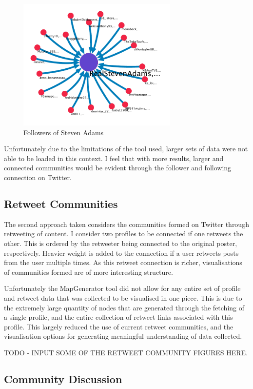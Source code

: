 \begin{figure}[h!]
\centering
\includegraphics[width=300px]{Images/steven_adams_followers.pdf}
\caption{Followers of Steven Adams}
\end{figure}

Unfortunately due to the limitations of the tool used, larger sets of data were not able to be loaded in this context. I feel that with more results, larger and connected communities would be evident through the follower and following connection on Twitter.

\subsection{Retweet Communities}

The second approach taken considers the communities formed on Twitter through retweeting of content. I consider two profiles to be connected if one retweets the other. This is ordered by the retweeter being connected to the original poster, respectively. Heavier weight is added to the connection if a user retweets posts from the user multiple times. As this retweet connection is richer, visualisations of communities formed are of more interesting structure. 

Unfortunately the MapGenerator tool did not allow for any entire set of profile and retweet data that was collected to be visualised in one piece. This is due to the extremely large quantity of nodes that are generated through the fetching of a single profile, and the entire collection of retweet links associated with this profile. This largely reduced the use of current retweet communities, and the visualisation options for generating meaningful understanding of data collected. 

TODO - INPUT SOME OF THE RETWEET COMMUNITY FIGURES HERE.

\subsection{Community Discussion}

